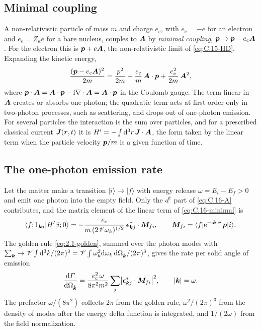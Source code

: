 \subsection{Minimal coupling}

A non-relativistic particle of mass $m$ and charge $e_{\mathrm{c}}$, with $e_{\mathrm{c}} = -e$ for an electron and $e_{\mathrm{c}} = Z_\kappa e$ for a bare nucleus, couples to $\bm{A}$ by \emph{minimal coupling}, $\bm{p} \to \bm{p} - e_{\mathrm{c}}\bm{A}$. For the electron this is $\bm{p} + e\bm{A}$, the non-relativistic limit of \cref{eq:C.15-HD}. Expanding the kinetic energy,
\begin{equation}
  \frac{(\bm{p} - e_{\mathrm{c}}\bm{A})^2}{2m} = \frac{p^2}{2m} - \frac{e_{\mathrm{c}}}{m}\,\bm{A}\cdot\bm{p} + \frac{e_{\mathrm{c}}^2}{2m}\,\bm{A}^2 ,
  \label{eq:C.16-minimal}
\end{equation}
where $\bm{p}\cdot\bm{A} = \bm{A}\cdot\bm{p} - \mathrm{i}\nabla\cdot\bm{A} = \bm{A}\cdot\bm{p}$ in the Coulomb gauge. The term linear in $\bm{A}$ creates or absorbs one photon; the quadratic term acts at first order only in two-photon processes, such as scattering, and drops out of one-photon emission. For several particles the interaction is the sum over particles, and for a prescribed classical current $\bm{J}(\bm{r}, t)$ it is $H' = -\int\mathrm{d}^3r\,\bm{J}\cdot\bm{A}$, the form taken by the linear term when the particle velocity $\bm{p}/m$ is a given function of time.

\subsection{The one-photon emission rate}

Let the matter make a transition $|i\rangle \to |f\rangle$ with energy release $\omega = E_i - E_f > 0$ and emit one photon into the empty field. Only the $d^\dagger$ part of \cref{eq:C.16-A} contributes, and the matrix element of the linear term of \cref{eq:C.16-minimal} is
\begin{equation*}
  \langle f; 1_{\bm{k}j}|H'|i; 0\rangle = -\frac{e_{\mathrm{c}}}{m\,(2\mathscr{V}\omega_k)^{1/2}}\,\boldsymbol{\epsilon}^*_{\bm{k}j}\cdot\bm{M}_{fi}, \qquad
  \bm{M}_{fi} = \langle f|\mathrm{e}^{-\mathrm{i}\bm{k}\cdot\bm{r}}\,\bm{p}|i\rangle .
\end{equation*}
The golden rule \cref{eq:2.1-golden}, summed over the photon modes with $\sum_{\bm{k}} \to \mathscr{V}\int\mathrm{d}^3k/(2\pi)^3 = \mathscr{V}\int\omega_k^2\mathrm{d}\omega_k\,\mathrm{d}\Omega_{\hat{\bm{k}}}/(2\pi)^3$, gives the rate per solid angle of emission
\begin{equation}
  \frac{\mathrm{d}\varGamma}{\mathrm{d}\Omega_{\hat{\bm{k}}}} = \frac{e_{\mathrm{c}}^2\,\omega}{8\pi^2m^2}\sum_j\bigl|\boldsymbol{\epsilon}^*_{\bm{k}j}\cdot\bm{M}_{fi}\bigr|^2, \qquad |\bm{k}| = \omega .
  \label{eq:C.16-rate}
\end{equation}
The prefactor $\omega/(8\pi^2)$ collects $2\pi$ from the golden rule, $\omega^2/(2\pi)^3$ from the density of modes after the energy delta function is integrated, and $1/(2\omega)$ from the field normalization.

